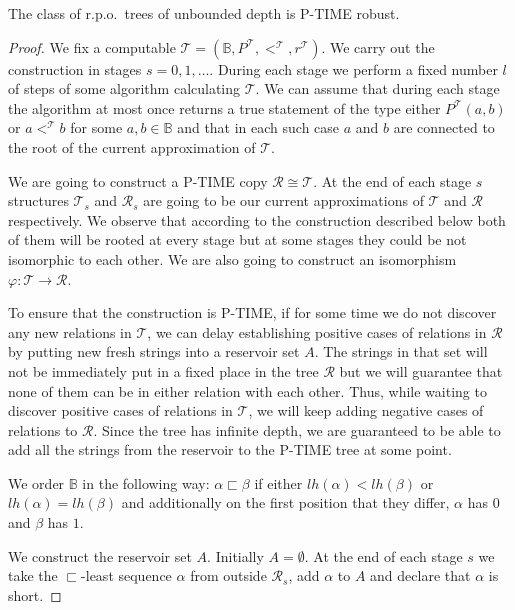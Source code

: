 \documentclass[a4paper,UKenglish,cleveref, autoref, thm-restate]{lipics-v2021}
\begin{document}
\begin{theorem}\label{ptime}
    The class of r.p.o.~trees of unbounded depth is P-TIME robust.

\end{theorem}
\begin{proof}    We fix a computable $\mathcal{T}=(\mathbb{B},P^{\mathcal{T}},<^{\mathcal{T}},r^{\mathcal{T}})$. We carry out the construction in stages $s=0,1,\dots$. During each stage we perform a fixed number $l$ of steps of some algorithm calculating $\mathcal{T}$. We can assume that during each stage the algorithm at most once returns a true statement of the type either $P^{\mathcal{T}}(a,b)$ or $a<^{\mathcal{T}}b$ for some $a,b \in \mathbb{B}$ and that in each such case $a$ and $b$ are connected to the root of the current approximation of $\mathcal{T}$.

    We are going to construct a P-TIME copy $\mathcal{R} \cong \mathcal{T}$. At the end of each stage $s$ structures $\mathcal{T}_s$ and $\mathcal{R}_s$ are going to be our current approximations of $\mathcal{T}$ and $\mathcal{R}$ respectively. We observe that according to the construction described below both of them will be rooted at every stage but at some stages they could be not isomorphic to each other. We are also going to construct an isomorphism $\varphi: \mathcal{T} \to \mathcal{R}$.

    To ensure that the construction is P-TIME, if for some time we do not discover any new relations in $\mathcal{T}$, we can delay establishing positive cases of relations in $\mathcal{R}$ by putting new fresh strings into a reservoir set $A$. The strings in that set will not be immediately put in a fixed place in the tree $\mathcal{R}$ but we will guarantee that none of them can be in either relation with each other. Thus, while waiting to discover positive cases of relations in $\mathcal{T}$, we will keep adding negative cases of relations to $\mathcal{R}$. Since the tree has infinite depth, we are guaranteed to be able to add all the strings from the reservoir to the P-TIME tree at some point.

    We order $\mathbb{B}$ in the following way: $\alpha \sqsubset \beta$ if either $lh(\alpha)<lh(\beta)$ or $lh(\alpha)=lh(\beta)$ and additionally on the first position that they differ, $\alpha$ has $0$ and $\beta$ has $1$.

    We construct the reservoir set $A$. Initially $A = \emptyset$. At the end of each stage $s$ we take the $\sqsubset$-least sequence $\alpha$ from outside $\mathcal{R}_s$, add $\alpha$ to $A$ and declare that $\alpha$ is short.


\end{proof}
\end{document}

